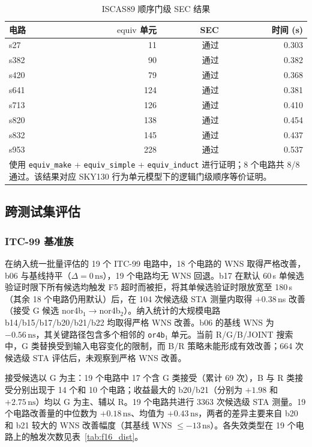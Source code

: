 \documentclass[twocolumn,10pt,fontset=windows]{ctexart}
\begin{document}
\begin{table}[!htb]
\centering
\caption{ISCAS89 顺序门级 SEC 结果}
\label{tab:sec_iscas8}
\setlength{\tabcolsep}{4pt}
\footnotesize
\begin{tabular}{lrrr}
\toprule
\textbf{电路} & \textbf{$\mathrm{equiv}$ 单元} & \textbf{SEC} & \textbf{时间 (s)} \\
\midrule
s27  & 11  & 通过 & 0.303 \\
s382 & 90  & 通过 & 0.382 \\
s420 & 79  & 通过 & 0.368 \\
s641 & 124 & 通过 & 0.381 \\
s713 & 126 & 通过 & 0.410 \\
s820 & 138 & 通过 & 0.454 \\
s832 & 145 & 通过 & 0.437 \\
s953 & 228 & 通过 & 0.537 \\
\bottomrule
\multicolumn{4}{p{0.92\columnwidth}}{\footnotesize 使用 \texttt{equiv\_make} + \texttt{equiv\_simple} + \texttt{equiv\_induct} 进行证明；8 个电路共 8/8 通过。该结果对应 SKY130 行为单元模型下的逻辑门级顺序等价证明。}\\
\end{tabular}
\end{table}

\subsection{跨测试集评估}\label{sec:ood}

\subsubsection{ITC-99 基准族}\label{sec:itc99}

在纳入统一批量评估的 19 个 ITC-99 电路中，18 个电路的 WNS 取得严格改善，b06 与基线持平（$\Delta = 0\,\text{ns}$），19 个电路均无 WNS 回退。b17 在默认 60\,s 单候选验证时限下所有候选均触发 F5 超时而被拒，将其单候选验证时限放宽至 180\,s（其余 18 个电路仍用默认）后，在 104 次候选级 STA 测量内取得 $+0.38\,$ns 改善（接受 G 候选 nor4b$_1\!\to\!$nor4b$_2$）。纳入统计的大规模电路 b14/b15/b17/b20/b21/b22 均取得严格 WNS 改善。b06 的基线 WNS 为 $-0.56\,\text{ns}$，其关键路径包含多个相邻的 \texttt{or4b$_1$} 单元。当前 R/G/B/JOINT 搜索中，G 类替换受到输入电容变化的限制，而 B/R 策略未能形成有效改善；664 次候选级 STA 评估后，未观察到严格 WNS 改善。

接受候选以 G 为主：19 个电路中 17 个含 G 类接受（累计 69 次），B 与 R 类接受分别出现于 14 个和 10 个电路；收益最大的 b20/b21（分别为 $+1.98$ 和 $+2.75\,\text{ns}$）均以 G 为主、辅以 R。19 个电路共进行 3363 次候选级 STA 测量。19 个电路改善量的中位数为 $+0.18\,\text{ns}$、均值为 $+0.43\,\text{ns}$，两者的差异主要来自 b20 和 b21 较大的 WNS 改善幅度（其基线 WNS $\le -13\,\text{ns}$）。各失效类型在 19 个电路上的触发次数见表~\ref{tab:f16_dist}。
\end{document}
